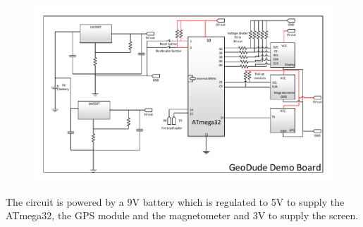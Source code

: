 \begin{figure}[H]
\centering
\includegraphics[width=1\textwidth]{billeder/GeodudeDemoBoard}
\end{figure}

The circuit is powered by a 9V battery which is regulated to 5V to supply the ATmega32, the GPS module and the magnetometer and 3V to supply the screen.